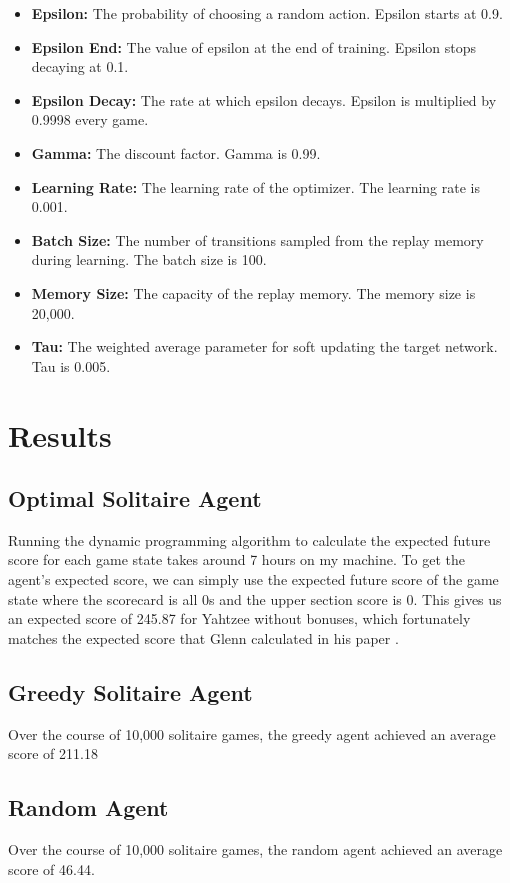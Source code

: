 \documentclass[12pt]{article}
\begin{document}
\begin{itemize}
    \item \textbf{Epsilon:} The probability of choosing a random action. Epsilon starts at 0.9.
    \item \textbf{Epsilon End:} The value of epsilon at the end of training. Epsilon stops decaying at 0.1.
    \item \textbf{Epsilon Decay:} The rate at which epsilon decays. Epsilon is multiplied by 0.9998 every game.
    \item \textbf{Gamma:} The discount factor. Gamma is 0.99.
    \item \textbf{Learning Rate:} The learning rate of the optimizer. The learning rate is 0.001.
    \item \textbf{Batch Size:} The number of transitions sampled from the replay memory during learning. The batch size is 100.
    \item \textbf{Memory Size:} The capacity of the replay memory. The memory size is 20,000.
    \item \textbf{Tau:} The weighted average parameter for soft updating the target network. Tau is 0.005.
\end{itemize}

\section{Results}

\subsection{Optimal Solitaire Agent}
Running the dynamic programming algorithm to calculate the expected future score for each game state takes around 7 hours on my machine. To get the agent's expected score, we can simply use the expected future score of the game state where the scorecard is all 0s and the upper section score is 0. This gives us an expected score of 245.87 for Yahtzee without bonuses, which fortunately matches the expected score that Glenn calculated in his paper \cite{glenn}.

\subsection{Greedy Solitaire Agent}
Over the course of 10,000 solitaire games, the greedy agent achieved an average score of 211.18

\subsection{Random Agent}
Over the course of 10,000 solitaire games, the random agent achieved an average score of 46.44.
\end{document}
